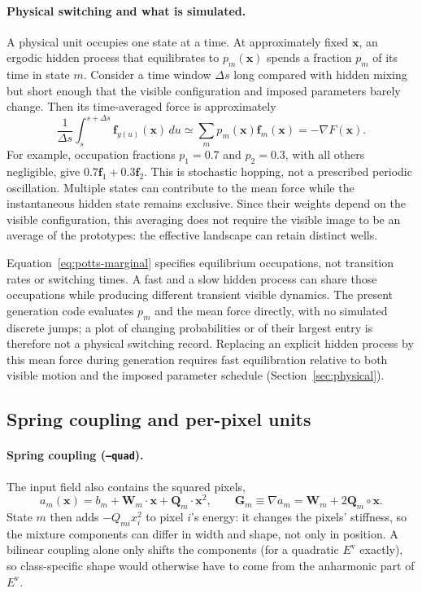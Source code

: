 \documentclass[11pt,a4paper]{article}
\newcommand{\vx}{\bm{x}}
\newcommand{\Ev}{E^{\mathrm{v}}}
\newcommand{\grad}{\nabla}
\begin{document}
\paragraph{Physical switching and what is simulated.} A physical unit occupies one state at a time. At
approximately fixed $\vx$, an ergodic hidden process that equilibrates to $p_m(\vx)$ spends a fraction $p_m$ of
its time in state $m$. Consider a time window $\Delta s$ long compared with hidden mixing but short enough that
the visible configuration and imposed parameters barely change. Then its time-averaged force is approximately
\begin{equation*}
  \frac{1}{\Delta s}\int_s^{s+\Delta s}\bm f_{y(u)}(\vx)\,du
  \simeq\sum_m p_m(\vx)\bm f_m(\vx)=-\grad F(\vx).
\end{equation*}
For example, occupation fractions $p_1=0.7$ and $p_2=0.3$, with all others negligible, give
$0.7\bm f_1+0.3\bm f_2$. This is stochastic hopping, not a prescribed periodic oscillation. Multiple states
can contribute to the mean force while the instantaneous hidden state remains exclusive. Since their weights
depend on the visible configuration, this averaging does not require the visible image to be an average of
the prototypes: the effective landscape can retain distinct wells.

Equation~\eqref{eq:potts-marginal} specifies equilibrium occupations, not transition rates or switching times.
A fast and a slow hidden process can share those occupations while producing different transient visible
dynamics. The present generation code evaluates $p_m$ and the mean force directly, with no simulated discrete
jumps; a plot of changing probabilities or of their largest entry is therefore not a physical switching
record. Replacing an explicit hidden process by this mean force during generation requires fast equilibration
relative to both visible motion and the imposed parameter schedule (Section~\ref{sec:physical}).

\subsection{Spring coupling and per-pixel units}
\paragraph{Spring coupling (\texttt{--quad}).} The input field also contains the squared pixels,
\begin{equation}
  a_m(\vx)=b_m+\bm W_m\cdot\vx+\bm Q_m\cdot\vx^{2},\qquad \bm G_m\equiv\grad a_m=\bm W_m+2\bm Q_m\circ\vx .
\end{equation}
State $m$ then adds $-Q_{mi}x_i^2$ to pixel $i$'s energy: it changes the pixels' stiffness, so the mixture
components can differ in width and shape, not only in position. A bilinear coupling alone only shifts the
components (for a quadratic $\Ev$ exactly), so class-specific shape would otherwise have to come from the
anharmonic part of $\Ev$.
\end{document}
